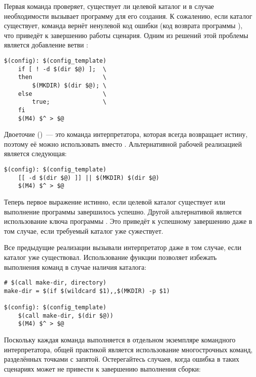 Первая команда проверяет, существует ли целевой каталог и в случае
необходимости вызывает программу  для его создания. К
сожалению, если каталог существует, команда  вернёт
ненулевой код ошибки (код возврата программы ), что
приведёт к завершению работы сценария. Одним из решений этой проблемы
является добавление ветви :

{\footnotesize
\begin{verbatim}
$(config): $(config_template)
    if [ ! -d $(dir $@) ];  \
    then                    \
        $(MKDIR) $(dir $@); \
    else                    \
        true;               \
    fi
    $(M4) $^ > $@
\end{verbatim}
}

Двоеточие (\command{:})~--- это команда интерпретатора, которая всегда
возвращает истину, поэтому её можно использовать вместо .
Альтернативной рабочей реализацией является следующая:

{\footnotesize
\begin{verbatim}
$(config): $(config_template)
    [[ -d $(dir $@) ]] || $(MKDIR) $(dir $@)
    $(M4) $^ > $@
\end{verbatim}
}

 Теперь первое выражение истинно, если целевой каталог существует или
 выполнение программы  завершилось успешно. Другой
 альтернативой является использование ключа  программы
 . Это приведёт к успешному завершению 
 даже в том случае, если требуемый каталог уже сужествует.

Все предыдущие реализации вызывали интерпретатор даже в том случае,
если каталог уже существовал. Использование функции
\function{wildcard} позволяет избежать выполнения команд в случае
наличия каталога:

{\footnotesize
\begin{verbatim}
# $(call make-dir, directory)
make-dir = $(if $(wildcard $1),,$(MKDIR) -p $1)

$(config): $(config_template)
    $(call make-dir, $(dir $@))
    $(M4) $^ > $@
\end{verbatim}
}

Поскольку каждая команда выполняется в отдельном экземпляре командного
интерпретатора, общей практикой является использование многострочных
команд, разделённых точками с запятой. Остерегайтесь случаев, когда
ошибка в таких сценариях может не привести к завершению выполнения
сборки:

